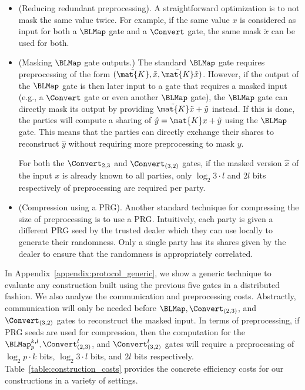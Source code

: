 \begin{itemize}

  \item (Reducing redundant preprocessing).
  A straightforward optimization is to not mask the same value twice. For example, if the same value $x$ is considered as input for both a $\BLMap$ gate and a $\Convert$ gate, the same mask $\tilde{x}$ can be used for both. 

  \item (Masking $\BLMap$ gate outputs.)
  The standard $\BLMap$ gate requires preprocessing of the form $(\tilde{\mat{K}}, \tilde{x}, \tilde{\mat{K}}\tilde{x})$. However, if the output of the $\BLMap$ gate is then later input to a gate that requires a masked input (e.g., a $\Convert$ gate or even another $\BLMap$ gate), the $\BLMap$ gate can directly mask its output by providing $\tilde{\mat{K}}\tilde{x} + \tilde{y}$ instead. If this is done, the parties will compute a sharing of $\hat{y} = \mat{K}x + \tilde{y}$ using the $\BLMap$ gate. This means that the parties can directly exchange their shares to reconstruct $\hat{y}$ without requiring more preprocessing to mask $y$.

  For both the $\Convert_{2,3}$ and $\Convert_{(3,2)}$ gates, if the masked version $\hat{x}$ of the input $x$ is already known to all parties, only $\log_2{3} \cdot l$ and $2l$ bits respectively of preprocessing are required per party. 

 
  \item (Compression using a PRG).
  Another standard technique for compressing the size of preprocessing is to use a PRG. Intuitively, each party is given a different PRG seed by the trusted dealer which they can use locally to generate their randomness. Only a single party has its shares given by the dealer to ensure that the randomness is appropriately correlated. 


\end{itemize}
\else
\noindent In Appendix~\ref{appendix:protocol_generic}, we show a generic technique to evaluate any construction built using the previous five gates in a distributed fashion. We also analyze the communication and preprocessing costs. Abstractly, communication will only be needed before $\BLMap, \Convert_{(2,3)}$, and $\Convert_{(3,2)}$ gates to reconstruct the masked input. In terms of preprocessing, if PRG seeds are used for compression, then the computation for the $\BLMap_p^{k,l}, \Convert^l_{(2,3)}$, and $\Convert^l_{(3,2)}$ gates will require a preprocessing of $\log_2{p} \cdot k$ bits, $\log_2{3} \cdot l$ bits, and $2l$ bits respectively. Table~\ref{table:construction_costs} provides the concrete efficiency costs for our constructions in a variety of settings.
\fi



